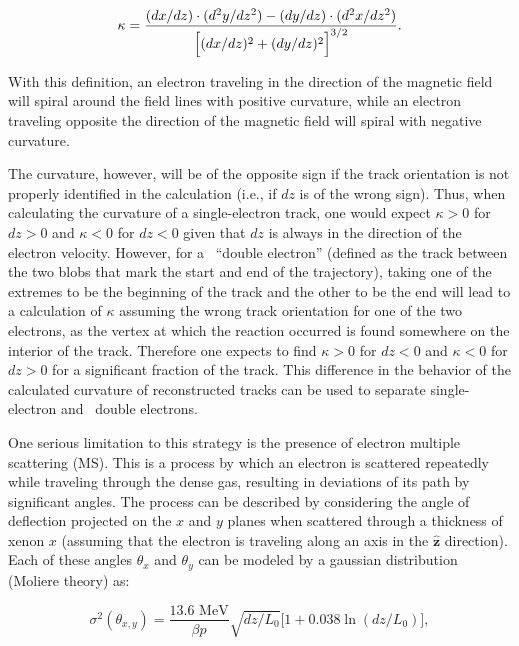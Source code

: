 \documentclass{JINST}
\begin{document}
\begin{equation}\label{eqn_curv}
\kappa = \frac{(dx/dz)\cdot(d^2y/dz^2) - (dy/dz)\cdot(d^2x/dz^2)}{\Bigl[(dx/dz)^2 + (dy/dz)^2\Bigr]^{3/2}}.
\end{equation}

With this definition, an electron traveling in the direction of the magnetic field will spiral around the field lines with positive curvature, while an electron traveling opposite the direction of the magnetic field will spiral with negative curvature.  

The curvature, however, will be of the opposite sign if the track orientation is not properly identified in the calculation (i.e., if $dz$ is of the wrong sign).  Thus, when calculating the curvature of a single-electron track, one would expect $\kappa > 0$ for $dz > 0$ and $\kappa < 0$ for $dz < 0$ given that $dz$ is always in the direction of the electron velocity.  However, for a \bbonu\ ``double electron'' (defined as the track between the two blobs that mark the start and end of the trajectory), taking one of the extremes to be the beginning of the track and the other to be the end will lead to a calculation of $\kappa$ assuming the wrong track orientation for one of the two electrons, as the vertex at which the reaction occurred is found somewhere on the interior of the track.  Therefore one expects to find $\kappa > 0$ for $dz < 0$ and $\kappa < 0$ for $dz > 0$ for a significant fraction of the track.  This difference in the behavior of the calculated curvature of reconstructed tracks can be used to separate single-electron and \bbonu\ double electrons.

One serious limitation to this strategy is the presence of electron multiple scattering (MS). This is a process by 
which an electron is scattered repeatedly while traveling through the dense gas, resulting in deviations of its
path by significant angles. The process can be described by considering the angle of deflection projected on the $x$ and $y$ planes when scattered
through a thickness of xenon $x$ (assuming that the electron is traveling along an axis in the $\hat{\mathbf{z}}$ direction). Each of these angles $\theta_x$ and $\theta_y$ can be modeled by a gaussian 
distribution (Moliere theory) as:

\begin{equation}\label{eqn_mscat}
\sigma^{2}(\theta_{x,y}) = \frac{13.6\,\,\mathrm{MeV}}{\beta p}\sqrt{dz/L_{0}}\bigl[1 + 0.038\ln(dz/L_{0})\bigr],
\end{equation}
\end{document}
